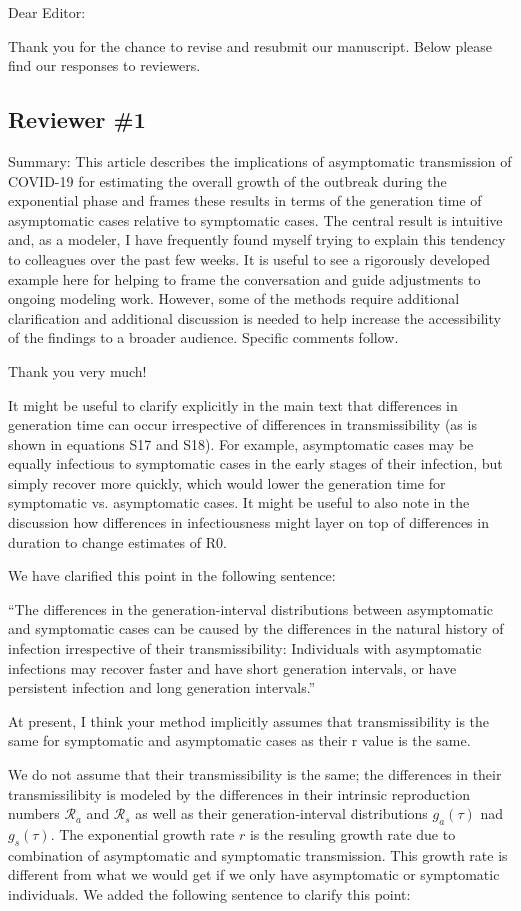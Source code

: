 \documentclass[12pt]{article}
\newcommand{\rev}{\subsection*}
\newcommand{\revtext}{\textsf}
\begin{document}
\noindent Dear Editor:

Thank you for the chance to revise and resubmit our manuscript. 
Below please find our responses to reviewers.

\rev{Reviewer \#1}

\revtext{Summary: This article describes the implications of asymptomatic transmission of COVID-19 for estimating the overall growth of the outbreak during the exponential phase and frames these results in terms of the generation time of asymptomatic cases relative to symptomatic cases.  The central result is intuitive and, as a modeler, I have frequently found myself trying to explain this tendency to colleagues over the past few weeks.  It is useful to see a rigorously developed example here for helping to frame the conversation and guide adjustments to ongoing modeling work.  However, some of the methods require additional clarification and additional discussion is needed to help increase the accessibility of the findings to a broader audience. Specific comments follow.}

Thank you very much!

\revtext{It might be useful to clarify explicitly in the main text that differences in generation time can occur irrespective of differences in transmissibility (as is shown in equations S17 and S18).  For example, asymptomatic cases may be equally infectious to symptomatic cases in the early stages of their infection, but simply recover more quickly, which would lower the generation time for symptomatic vs. asymptomatic cases.  It might be useful to also note in the discussion how differences in infectiousness might layer on top of differences in duration to change estimates of R0.} 

We have clarified this point in the following sentence:

``The differences in the generation-interval distributions between asymptomatic and symptomatic cases can be caused by the differences in the natural history of infection irrespective of their transmissibility:
Individuals with asymptomatic infections may recover faster and have short generation intervals, or have persistent infection and long generation intervals.''

\revtext{At present, I think your method implicitly assumes that transmissibility is the same for symptomatic and asymptomatic cases as their r value is the same.}

We do not assume that their transmissibility is the same; the differences in their transmissilibity is modeled by the differences in their intrinsic reproduction numbers $\mathcal R_a$ and $\mathcal R_s$ as well as their generation-interval distributions $g_a(\tau)$ nad $g_s(\tau)$. The exponential growth rate $r$ is the resuling growth rate due to combination of asymptomatic and symptomatic transmission. This growth rate is different from what we would get if we only have asymptomatic or symptomatic individuals. We added the following sentence to clarify this point:
\end{document}
